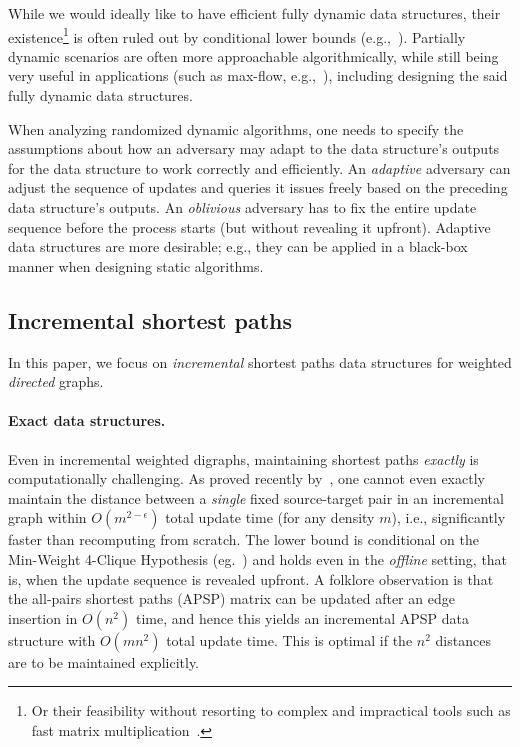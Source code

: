 \documentclass[11pt,letterpaper]{article}
\theoremstyle{plain}
\newcommand{\eps}{\ensuremath{\epsilon}}
\begin{document}
While we would ideally like to have efficient fully dynamic data structures, their existence\footnote{Or their feasibility without resorting to complex and impractical tools such as fast matrix multiplication~\cite{AbboudW14}.} is often ruled out by conditional lower bounds (e.g.,~\cite{AbboudW14, AnconaHRWW19, JinX22}).
Partially dynamic scenarios are often more approachable algorithmically, while still being very useful in applications (such as max-flow, e.g.,~\cite{BernsteinGS21, Madry10}), including designing the said fully dynamic data structures.

When analyzing randomized dynamic algorithms, one needs to specify the assumptions about how an adversary may adapt to the data structure's outputs for the data structure to work correctly and efficiently.
An \emph{adaptive} adversary can adjust the sequence of updates and queries it issues freely based on the preceding data structure's outputs.
An \emph{oblivious} adversary has to fix the entire update sequence before the process starts (but without revealing it upfront).
Adaptive data structures are more desirable; e.g., they can be applied in a black-box manner when designing static algorithms.

\subsection{Incremental shortest paths}
In this paper, we focus on \emph{incremental} shortest paths data structures for weighted \emph{directed} graphs.

\paragraph{Exact data structures.}
Even in incremental weighted digraphs, maintaining shortest paths \emph{exactly} is computationally challenging.
As proved recently by~\cite{SahaWX025}, one cannot even exactly maintain the distance between a \emph{single} fixed source-target pair in an incremental graph within $O(m^{2-\eps})$ total update time (for any density $m$), i.e., significantly faster than recomputing from scratch.
The lower bound is conditional on the Min-Weight 4-Clique Hypothesis (eg.~\cite{AbboudWW14, BackursT17, LincolnWW18}) and holds even in the \emph{offline} setting, that is, when the update sequence is revealed upfront.
A folklore observation is that the all-pairs shortest paths (APSP) matrix can be updated after an edge insertion in $O(n^2)$ time, and hence this yields an incremental APSP data structure with $O(mn^2)$ total update time.
This is optimal if the $n^2$ distances are to be maintained explicitly.
\end{document}
